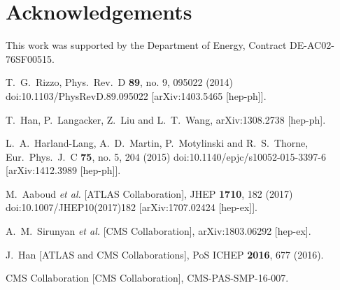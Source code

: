 \documentclass[14pt]{article}
\begin{document}
\section*{Acknowledgements}


%
This work was supported by the Department of Energy, Contract DE-AC02-76SF00515.




\begin{thebibliography}{99}


  T.~G.~Rizzo,
  Phys.\ Rev.\ D {\bf 89}, no. 9, 095022 (2014)
  doi:10.1103/PhysRevD.89.095022
  [arXiv:1403.5465 [hep-ph]].
  
  T.~Han, P.~Langacker, Z.~Liu and L.~T.~Wang,
  arXiv:1308.2738 [hep-ph].
 
  L.~A.~Harland-Lang, A.~D.~Martin, P.~Motylinski and R.~S.~Thorne,
  Eur.\ Phys.\ J.\ C {\bf 75}, no. 5, 204 (2015)
  doi:10.1140/epjc/s10052-015-3397-6
  [arXiv:1412.3989 [hep-ph]].
  

  M.~Aaboud {\it et al.} [ATLAS Collaboration],
  JHEP {\bf 1710}, 182 (2017)
  doi:10.1007/JHEP10(2017)182
  [arXiv:1707.02424 [hep-ex]].


  A.~M.~Sirunyan {\it et al.} [CMS Collaboration],
  arXiv:1803.06292 [hep-ex].


  J.~Han [ATLAS and CMS Collaborations],
  PoS ICHEP {\bf 2016}, 677 (2016).
 
  CMS Collaboration [CMS Collaboration],
  CMS-PAS-SMP-16-007.
  


\end{thebibliography}

\end{document}
